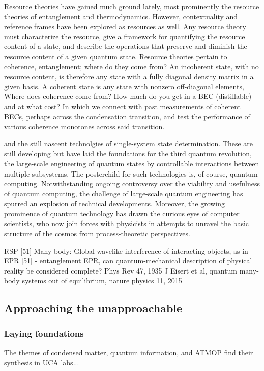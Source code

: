	Resource theories have gained much ground lately, most prominently the resource theories of entanglement and thermodynamics.
	However, contextuality and reference frames have been explored as resources as well.
	Any resource theory must characterize the resource, give a framework for quantifying the resource content of a state, and describe the operations that preserve and diminish the resource content of a given quantum state.
	Resource theories pertain to coherence, entanglement; where do they come from? An incoherent state, with no resource content, is therefore any state with a fully diagonal density matrix in a given basis.
	A coherent state is any state with  nonzero off-diagonal elements, Where does coherence come from? How much do you get in a BEC (distillable) and at what cost?	In which we connect with past measurements of coherent BECs, perhaps across the condensation transition, and test the performance of various coherence monotones across said transition.


	and the still nascent technolgies of single-system state determination.
	These are still developing but have laid the foundations for the third
	quantum revolution, the large-scale engineering of quantum states by
	controllable interactions between multiple subsystems.
	The posterchild
	for such technologies is, of course, quantum computing.
	Notwithstanding
	ongoing controversy over the viability and usefulness of quantum
	computing, the challenge of large-scale quantum engineering has spurred
	an explosion of technical developments.
	Moreover, the growing prominence
	of quantum technology has drawn the curious eyes of computer scientists,
	who now join forces with physicists in attempts to unravel the basic
	structure of the cosmos from process-theoretic perspectives.


	RSP [51] Many-body: Global wavelike interference of interacting objects, as in EPR [51] - entanglement 
	EPR, can quantum-mechanical description of physical reality be considered complete? Phys Rev 47, 1935
	J Eisert et al, quantum many-body systems out of equilibrium, nature physics 11, 2015

\subsection*{Approaching the unapproachable} %
	\subsubsection{Laying foundations}
	The themes of condensed matter, quantum information, and ATMOP find their synthesis in UCA labs...

